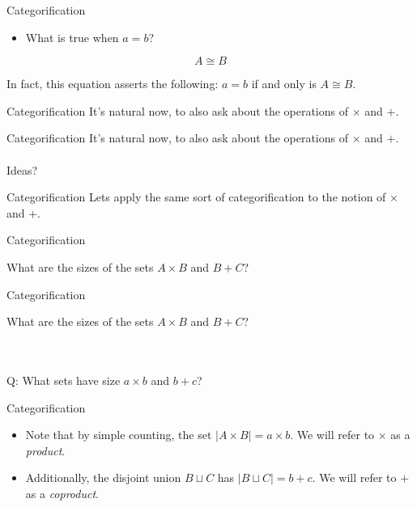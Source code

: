 \documentclass[tikz]{beamer}
\theoremstyle{definition}
\begin{document}
\begin{frame}{Categorification}
    \begin{block}{}
        \begin{itemize}
            \item What is true when $a = b$?
        \end{itemize}

        \begin{equation*}
            A \cong B
        \end{equation*}
    \end{block}
    In fact, this equation asserts the following: $a = b$ if and only is $A \cong B$.
\end{frame}

\begin{frame}{Categorification}
    It's natural now, to also ask about the operations of $\times$ and $+$.
\end{frame}

\begin{frame}{Categorification}
    It's natural now, to also ask about the operations of $\times$ and $+$.
    \\
    \\Ideas?
\end{frame}

\begin{frame}{Categorification}
    Lets apply the same sort of categorification to the notion of $\times$ and +. 
    
\end{frame}

\begin{frame}{Categorification}

What are the sizes of the sets $A \times B$ and $B + C$?
    
\end{frame}

\begin{frame}{Categorification}

What are the sizes of the sets $A \times B$ and $B + C$?

\\
\\
Q: What sets have size $a \times b$ and $b + c$?

\end{frame}{}

\begin{frame}{Categorification}
    \begin{itemize}
        \item Note that by simple counting, the set $|A \times B| = a \times b$. We will refer to $\times$ as a \textit{product}.
        \item Additionally, the disjoint union $B \sqcup C$ has $|B \sqcup C| = b + c$. We will refer to $+$ as a \textit{coproduct}. 
    \end{itemize}
\end{frame}{}
\end{document}
